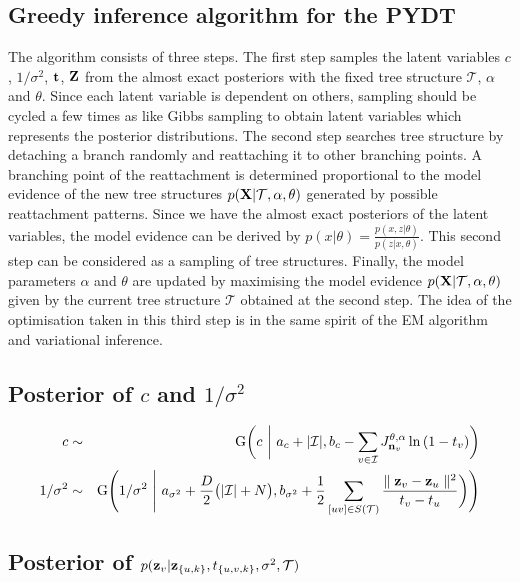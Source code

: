 \documentclass{article}
\begin{document}
	\subsection{Greedy inference algorithm for the PYDT}
	The algorithm consists of three steps. The first step samples the latent variables $c$, $1/\sigma^2$, $\bold{t}$, $\bold{Z}$ from the almost exact posteriors with the fixed tree structure $\mathcal{T}$, $\alpha$ and $\theta$. Since each latent variable is dependent on others, sampling should be cycled a few times as like Gibbs sampling to obtain latent variables which represents the posterior distributions. The second step searches tree structure by detaching a branch randomly and reattaching it to other branching points. A branching point of the reattachment is determined proportional to the model evidence of the new tree structures $p(\bold{X} | \mathcal{T}, \alpha, \theta)$ generated by possible reattachment patterns. Since we have the almost exact posteriors of the latent variables, the model evidence can be derived by $p(x | \theta) = \frac{p(x, z | \theta)}{p(z|x, \theta)}$. This second step can be considered as a sampling of tree structures. Finally, the model parameters $\alpha$ and $\theta$ are updated by maximising the model evidence $p(\bold{X} | \mathcal{T}, \alpha, \theta)$ given by the current tree structure $\mathcal{T}$ obtained at the second step. The idea of the optimisation taken in this third step is in the same spirit of the EM algorithm and variational inference.
	
	\subsection{Posterior of $c$ and $1/\sigma^2$}
	\begin{eqnarray}
		c &\sim& \textrm{G} \bigg( c \ \bigg| \ a_c + |\mathcal{I}|, b_c - \sum_{v \in \mathcal{I}} J^{\theta, \alpha}_{\bold{n}_v} \ln{(1 - t_v)} \bigg) \\
		1/\sigma^2 &\sim& \textrm{G} \Bigg( 1/\sigma^2 \ \Bigg| \ a_{\sigma^2} + \frac{D}{2} \big( |\mathcal{I}| + N \big), b_{\sigma^2} + \frac{1}{2}\sum_{[uv] \in S(\mathcal{T})} \frac{\parallel \bold{z}_v - \bold{z}_u \parallel^2}{t_v - t_u} \bigg) \Bigg) \nonumber \\
	\end{eqnarray}

	
	\subsection{Posterior of $p(\bold{z}_v | \bold{z}_{\{u, k\}}, t_{\{u, v, k\}}, \sigma^2, \mathcal{T})$}	
\end{document}
